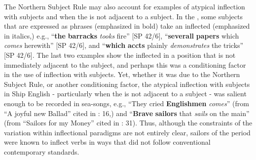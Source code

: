 The Northern Subject Rule may also account for examples of atypical inflection with   subjects and when the  is not adjacent to a subject. In the , some   subjects that are expressed as  phrases (emphasized in bold) take an inflected  (emphasized in italics,) e.g., “\textbf{the} \textbf{barracks} \textit{tooks} fire” [SP 42/6], “\textbf{severall} \textbf{papers} which \textit{comes} herewith” [SP 42/6], and “\textbf{which} \textbf{accts} plainly \textit{demonstrates} the tricks” [SP 42/6]. The last two examples show the inflected  in a position that is not immediately adjacent to the  subject, and perhaps this was a conditioning factor in the use of inflection with  subjects. Yet, whether it was due to the Northern Subject Rule, or another conditioning factor, the atypical inflection with   subjects in Ship English - particularly when the  is not adjacent to a subject - was salient enough to be recorded in  sea-songs, e.g., “They cried \textbf{Englishmen} \textit{comes}” (from “A joyful new Ballad” cited in \citealt{Palmer1986}: 16,) and “\textbf{Brave} \textbf{sailors} that \textit{sails} on the main” (from “Sailors for my Money” cited in \citealt{Palmer1986}: 31). Thus, although the constraints of the variation within inflectional paradigms are not entirely clear, sailors of the period were known to inflect verbs in ways that did not follow conventional contemporary standards. 

